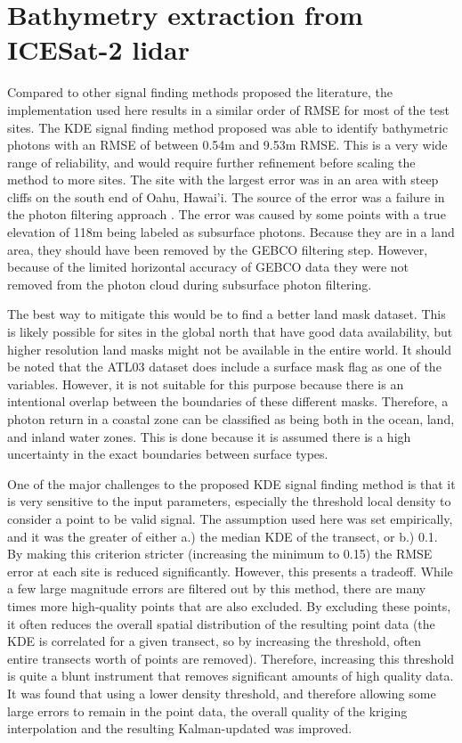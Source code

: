 

\section{Bathymetry extraction from ICESat-2 lidar}

Compared to other signal finding methods proposed the literature, the implementation used here results in a similar order of RMSE for most of the test sites. The KDE signal finding method proposed was able to identify bathymetric photons with an RMSE of between 0.54m and 9.53m RMSE. This is a very wide range of reliability, and would require further refinement before scaling the method to more sites. The site with the largest error was in an area with steep cliffs on the south end of Oahu, Hawai'i. The source of the error was a failure in the photon filtering approach . The error was caused by some points with a true elevation of 118m being labeled as subsurface photons. Because they are in a land area, they should have been removed by the GEBCO filtering step. However, because of the limited horizontal accuracy of GEBCO data they were not removed from the photon cloud during subsurface photon filtering.

The best way to mitigate this would be to find a better land mask dataset. This is likely possible for sites in the global north that have good data availability, but higher resolution land masks might not be available in the entire world. It should be noted that the ATL03 dataset does include a surface mask flag as one of the variables. However, it is not suitable for this purpose because there is an intentional overlap between the boundaries of these different masks. Therefore, a photon return in a coastal zone can be classified as being both in the ocean, land, and inland water zones. This is done because it is assumed there is a high uncertainty in the exact boundaries between surface types. 

One of the major challenges to the proposed KDE signal finding method is that it is very sensitive to the input parameters, especially the threshold local density to consider a point to be valid signal. The assumption used here was set empirically, and it was the greater of either a.) the median KDE of the transect, or b.) 0.1. By making this criterion stricter (increasing the minimum to 0.15) the RMSE error at each site is reduced significantly. However, this presents a tradeoff. While a few large magnitude errors are filtered out by this method, there are many times more high-quality points that are also excluded. By excluding these points, it often reduces the overall spatial distribution of the resulting point data (the KDE is correlated for a given transect, so by increasing the threshold, often entire transects worth of points are removed). Therefore, increasing this threshold is quite a blunt instrument that removes significant amounts of high quality data. It was found that using a lower density threshold, and therefore allowing some large errors to remain in the point data, the overall quality of the kriging interpolation and the resulting Kalman-updated was improved. 

